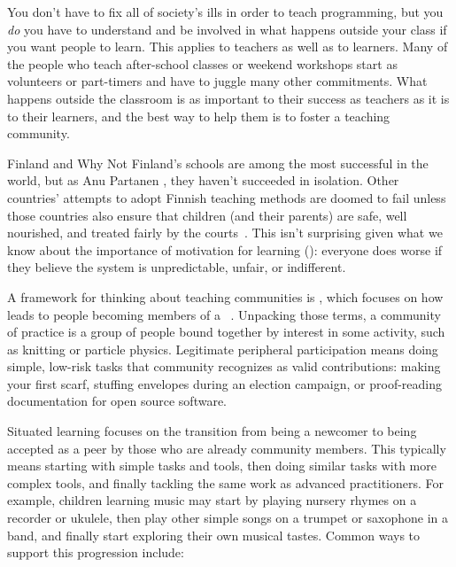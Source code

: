 
You don't have to fix all of society's ills in order to teach programming,
but you \emph{do} you have to understand and be involved in
what happens outside your class if you want people to learn.
This applies to teachers as well as to learners.
Many of the people who teach after-school classes or weekend workshops
start as volunteers or part-timers
and have to juggle many other commitments.
What happens outside the classroom is as important to their success as teachers
as it is to their learners,
and the best way to help them is to foster a teaching community.

\begin{aside}{Finland and Why Not}
  Finland's schools are among the most successful in the world,
  but as Anu Partanen ,
  they haven't succeeded in isolation.
  Other countries' attempts to adopt Finnish teaching methods are doomed to fail
  unless those countries also ensure that children (and their parents) are safe,
  well nourished,
  and treated fairly by the courts~\cite{Sahl2015,Wilk2011}.
  This isn't surprising given what we know about the importance of motivation for learning ():
  everyone does worse if they believe the system is unpredictable, unfair, or indifferent.
\end{aside}

A framework for thinking about teaching communities is ,
which focuses on how 
leads to people becoming members of
a ~\cite{Weng2015}.
Unpacking those terms,
a community of practice is a group of people bound together by interest in some activity,
such as knitting or particle physics.
Legitimate peripheral participation means doing simple, low-risk tasks
that community recognizes as valid contributions:
making your first scarf,
stuffing envelopes during an election campaign,
or proof-reading documentation for open source software.

Situated learning focuses on the transition from being a newcomer
to being accepted as a peer by those who are already community members.
This typically means starting with simple tasks and tools,
then doing similar tasks with more complex tools,
and finally tackling the same work as advanced practitioners.
For example,
children learning music may start by playing nursery rhymes on a recorder or ukulele,
then play other simple songs on a trumpet or saxophone in a band,
and finally start exploring their own musical tastes.
Common ways to support this progression include:

